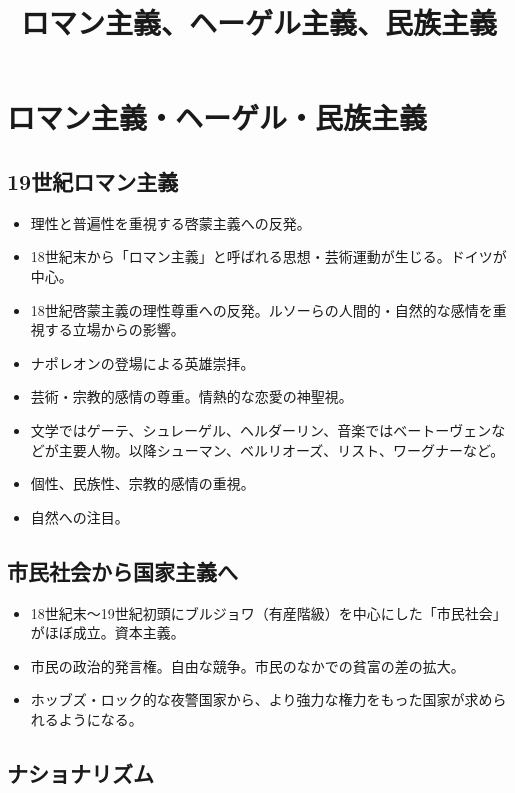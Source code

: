 \documentclass[uplatex,dvipdfmx]{jsarticle} \usepackage{mystyle}%
\title{ロマン主義、ヘーゲル主義、民族主義}
\begin{document}
\maketitle
\else\chapter{ロマン主義・ヘーゲル・民族主義}
\fi



\section{19世紀ロマン主義}

\begin{itemize}
\item 理性と普遍性を重視する啓蒙主義への反発。
\item 18世紀末から「ロマン主義」と呼ばれる思想・芸術運動が生じる。ドイツが中心。
\item 18世紀啓蒙主義の理性尊重への反発。ルソーらの人間的・自然的な感情を重視する立場からの影響。
\item ナポレオンの登場による英雄崇拝。
\item 芸術・宗教的感情の尊重。情熱的な恋愛の神聖視。
\item 文学ではゲーテ、シュレーゲル、ヘルダーリン、音楽ではベートーヴェンなどが主要人物。以降シューマン、ベルリオーズ、リスト、ワーグナーなど。
\item 個性、民族性、宗教的感情の重視。
\item 自然への注目。
\end{itemize}


\section{市民社会から国家主義へ}

\begin{itemize}
\item 18世紀末〜19世紀初頭にブルジョワ（有産階級）を中心にした「市民社会」がほぼ成立。資本主義。
\item 市民の政治的発言権。自由な競争。市民のなかでの貧富の差の拡大。
\item ホッブズ・ロック的な夜警国家から、より強力な権力をもった国家が求められるようになる。
\end{itemize}


\section{ナショナリズム}
\end{document}
